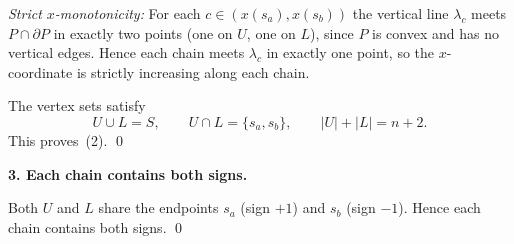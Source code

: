 \emph{Strict \(x\)-monotonicity:} For each \(c\in(x(s_a),x(s_b))\) the vertical line
\(\lambda_c\) meets \(P\cap\partial P\) in exactly two points (one on \(U\), one on \(L\)),
since \(P\) is convex and has no vertical edges.  Hence each chain meets \(\lambda_c\) in
exactly one point, so the \(x\)-coordinate is strictly increasing along each chain.

The vertex sets satisfy
\[
U\cup L=S,\qquad U\cap L=\{s_a,s_b\},
\qquad |U|+|L|=n+2.
\]
This proves~(2). \qed

\medskip
\textbf{3. Each chain contains both signs.}

Both \(U\) and \(L\) share the endpoints \(s_a\) (sign \(+1\)) and \(s_b\) (sign \(-1\)).
Hence each chain contains both signs. \qed
